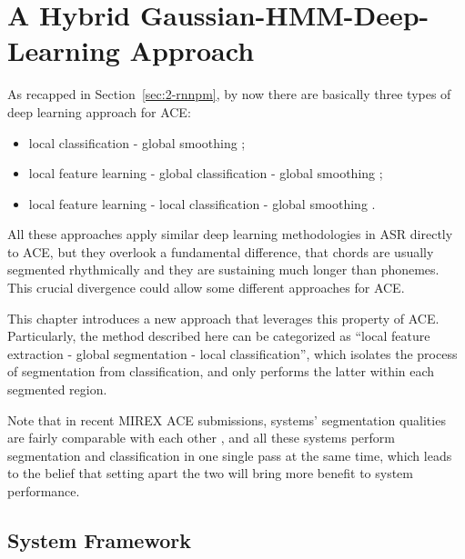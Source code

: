 
\chapter{A Hybrid Gaussian-HMM-Deep-Learning Approach}\label{cp:ghmm} %


As recapped in Section~\ref{sec:2-rnnpm}, by now there are basically three types of deep learning approach for ACE:
\begin{itemize}
\item local classification - global smoothing \cite{humphrey2012rethinking};
\item local feature learning - global classification - global smoothing \cite{boulanger2013audio,sigtia2015audio};
\item local feature learning - local classification - global smoothing \cite{zhou2015chord}.
\end{itemize}
All these approaches apply similar deep learning methodologies in ASR \cite{deng2014deep,bourlard2012connectionist} directly to ACE, but they overlook a fundamental difference, that chords are usually segmented rhythmically and they are sustaining much longer than phonemes. This crucial divergence could allow some different approaches for ACE.

This chapter introduces a new approach that leverages this property of ACE. Particularly, the method described here can be categorized as ``local feature extraction - global segmentation - local classification'', which isolates the process of segmentation from classification, and only performs the latter within each segmented region.

Note that in recent MIREX ACE submissions, systems' segmentation qualities are fairly comparable with each other \cite{burgoyne2014comparative}, and all these systems perform segmentation and classification in one single pass at the same time, which leads to the belief that setting apart the two will bring more benefit to system performance.


\section{System Framework} \label{sec:3-sysframe}

